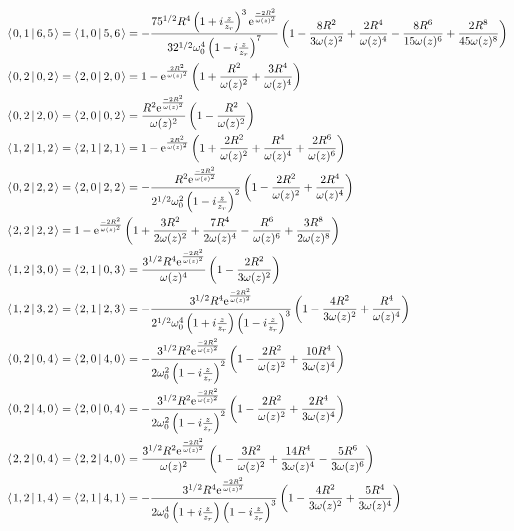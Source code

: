 \documentclass[11pt]{amsart}
\makeatletter
\newcommand{\e}{{\rm e}}				%
\newcommand{\msp}[1]{\mspace{#1mu}}		%
\newcommand{\0}{\varnothing}		%
\newcommand{\brac}[2]{\left\langle\msp{2} #1\left\lvert \msp{3.5} #2 \right.\right\rangle}	%
\newcommand{\1}{!}
\newcommand{\2}{@}
\newcommand{\3}{\#}
\newcommand{\4}{\$}
\newcommand{\5}{\%}
\newcommand{\6}{$^\wedge$}
\newcommand{\7}{\&}
\newcommand{\8}{*}
\newcommand{\9}{(}
\makeatother
\begin{document}
\begin{align*}
&
\brac{0,1}{6,5} = \brac{1,0}{5,6} = -\frac{75^{1/2}R^4\left(1+i\frac{z}{z_r}\right)^3\e^{\frac{-2R^2}{\omega(z)^2}}}{32^{1/2}\omega_0^4\left(1-i\frac{z}{z_r}\right)^7}\left(1-\frac{8R^2}{3\omega(z)^2}+\frac{2R^4}{\omega(z)^4}-\frac{8R^6}{15\omega(z)^6}+\frac{2R^8}{45\omega(z)^8}\right)
\\
&
\brac{0,2}{0,2}=\brac{2,0}{2,0} = 1-\e^{\frac{2R^2}{\omega(z)^2}}\left(1+\frac{R^2}{\omega(z)^2}+\frac{3R^4}{\omega(z)^4}\right)
\\
&
\brac{0,2}{2,0} = \brac{2,0}{0,2} = \frac{R^2\e^{\frac{-2R^2}{\omega(z)^2}}}{\omega(z)^2}\left(1-\frac{R^2}{\omega(z)^2}\right)
\\
&
\brac{1,2}{1,2}=\brac{2,1}{2,1}=1-\e^{\frac{2R^2}{\omega(z)^2}}\left(1+\frac{2R^2}{\omega(z)^2}+\frac{R^4}{\omega(z)^4}+\frac{2R^6}{\omega(z)^6}\right)
\\
&
\brac{0,2}{2,2} = \brac{2,0}{2,2} = -\frac{R^2\e^{\frac{-2R^2}{\omega(z)^2}}}{2^{1/2}\omega_0^2\left(1-i\frac{z}{z_r}\right)^2}\left(1-\frac{2R^2}{\omega(z)^2}+\frac{2R^4}{\omega(z)^4}\right)
\\
&
\brac{2,2}{2,2} = 1-\e^{\frac{-2R^2}{\omega(z)^2}}\left(1+\frac{3R^2}{2\omega(z)^2}+\frac{7R^4}{2\omega(z)^4}-\frac{R^6}{\omega(z)^6}+\frac{3R^8}{2\omega(z)^8}\right)
\\
&
\brac{1,2}{3,0}=\brac{2,1}{0,3}=\frac{3^{1/2}R^4\e^{\frac{-2R^2}{\omega(z)^2}}}{\omega(z)^4}\left(1-\frac{2R^2}{3\omega(z)^2}\right)
\\
&
\brac{1,2}{3,2} = \brac{2,1}{2,3} = -\frac{3^{1/2}R^4\e^{\frac{-2R^2}{\omega(z)^2}}}{2^{1/2}\omega_0^4\left(1+i\frac{z}{z_r}\right)\left(1-i\frac{z}{z_r}\right)^3}\left(1-\frac{4R^2}{3\omega(z)^2}+\frac{R^4}{\omega(z)^4}\right)
\\
&
\brac{0,2}{0,4} = \brac{2,0}{4,0} = -\frac{3^{1/2}R^2\e^{\frac{-2R^2}{\omega(z)^2}}}{2\omega_0^2\left(1-i\frac{z}{z_r}\right)^2}\left(1-\frac{2R^2}{\omega(z)^2}+\frac{10R^4}{3\omega(z)^4}\right)
\\
&
\brac{0,2}{4,0} = \brac{2,0}{0,4} = -\frac{3^{1/2}R^2\e^{\frac{-2R^2}{\omega(z)^2}}}{2\omega_0^2\left(1-i\frac{z}{z_r}\right)^2}\left(1-\frac{2R^2}{\omega(z)^2}+\frac{2R^4}{3\omega(z)^4}\right)
\\
&
\brac{2,2}{0,4} = \brac{2,2}{4,0}=\frac{3^{1/2}R^2\e^{\frac{-2R^2}{\omega(z)^2}}}{\omega(z)^2}\left(1-\frac{3R^2}{\omega(z)^2}+\frac{14R^4}{3\omega(z)^4}-\frac{5R^6}{3\omega(z)^6}\right)
\\
&
\brac{1,2}{1,4} = \brac{2,1}{4,1} = -\frac{3^{1/2}R^4\e^{\frac{-2R^2}{\omega(z)^2}}}{2\omega_0^4\left(1+i\frac{z}{z_r}\right)\left(1-i\frac{z}{z_r}\right)^3}\left(1-\frac{4R^2}{3\omega(z)^2}+\frac{5R^4}{3\omega(z)^4}\right)

\end{align*}
\end{document}
